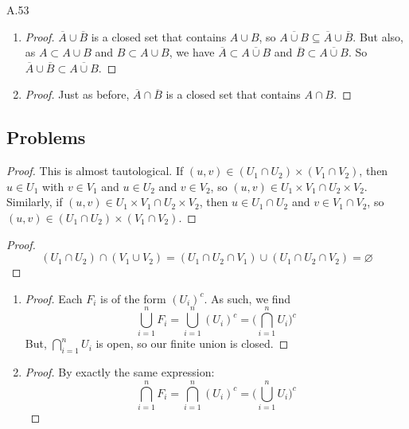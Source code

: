 \begin{customprob}{A.53}
\end{customprob}
\begin{enumerate}[label=(\alph*)]
	\item \begin{proof}
		      $\overline{A} \cup \overline{B}$ is a closed set that contains $A \cup B$, so $\overline{A \cup B} \subseteq \overline{A} \cup \overline{B}$.
		      But also, as $A \subset A \cup B$ and $B \subset A \cup B$, we have $\overline{A} \subset \overline{A \cup B}$ and
		      $\overline{B} \subset \overline{A \cup B}$. So  $\overline{A} \cup \overline{B} \subset \overline{A \cup B}$.
	      \end{proof}
	\item \begin{proof}
		      Just as before, $\overline{A} \cap \overline{B}$ is a closed set that contains $A \cap B$.
	      \end{proof}
\end{enumerate}

\subsection{Problems}
\begin{problem}
\end{problem}
\begin{proof}
	This is almost tautological. If $(u,v) \in (U_1 \cap U_2) \times (V_1 \cap V_2)$, then $u \in U_1$ with $v \in V_1$ and
	$u \in U_2$ and $v \in V_2$, so $(u,v) \in U_1 \times V_1 \cap U_2 \times V_2$. Similarly, if $(u,v) \in U_1 \times V_1 \cap U_2 \times V_2$,
	then $u \in U_1 \cap U_2$ and $v \in V_1 \cap V_2$, so $(u,v) \in (U_1 \cap U_2) \times (V_1 \cap V_2)$.
\end{proof}

\begin{problem}
\end{problem}

\begin{proof}
	$$(U_1 \cap U_2) \cap (V_1 \cup V_2) = (U_1 \cap U_2 \cap V_1) \cup (U_1 \cap U_2 \cap V_2) = \varnothing$$
\end{proof}

\begin{problem}
\end{problem}

\begin{enumerate}[label=(\alph*)]
	\item \begin{proof}
		      Each $F_i$ is of the form $(U_i)^c$. As such, we find
		      $$\bigcup_{i=1}^{n} F_i = \bigcup_{i=1}^{n} (U_i)^c = \bigg( \bigcap_{i=1}^{n} U_i \bigg)^c$$
		      But, $\bigcap_{i=1}^{n} U_i$ is open, so our finite union is closed.
	      \end{proof}
	\item \begin{proof}
		      By exactly the same expression:
		      $$\bigcap_{i=1}^{n} F_i = \bigcap_{i=1}^{n} (U_i)^c = \bigg( \bigcup_{i=1}^{n} U_i \bigg)^c$$
	      \end{proof}
\end{enumerate}

